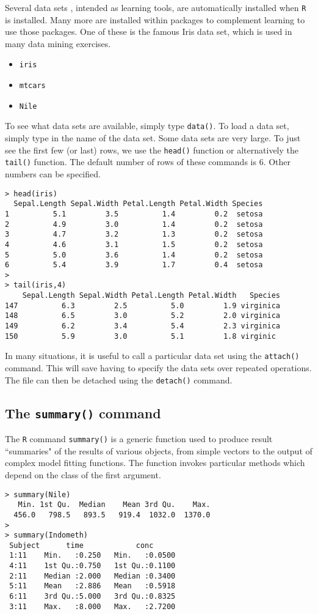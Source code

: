 \documentclass[a4paper,12pt]{article}
\begin{document}
Several data sets , intended as learning tools, are automatically installed when \texttt{R} is installed. Many more are installed within packages to complement learning to use those packages. One of these is the famous Iris data set, which is used in many data mining exercises.
\begin{itemize}
\item \texttt{iris}
\item \texttt{mtcars}
\item \texttt{Nile}
\end{itemize}
To see what data sets are available, simply type \texttt{data()}.
To load a data set, simply type in the name of the data set. Some data sets are very large. To just see the first few (or last)  rows, we use the \texttt{head()} function or alternatively the \texttt{tail()} function. The default number of rows of these commands is 6. Other numbers can be specified.
\begin{verbatim} 
> head(iris)
  Sepal.Length Sepal.Width Petal.Length Petal.Width Species
1          5.1         3.5          1.4         0.2  setosa
2          4.9         3.0          1.4         0.2  setosa
3          4.7         3.2          1.3         0.2  setosa
4          4.6         3.1          1.5         0.2  setosa
5          5.0         3.6          1.4         0.2  setosa
6          5.4         3.9          1.7         0.4  setosa
>
> tail(iris,4)
    Sepal.Length Sepal.Width Petal.Length Petal.Width   Species
147          6.3         2.5          5.0         1.9 virginica
148          6.5         3.0          5.2         2.0 virginica
149          6.2         3.4          5.4         2.3 virginica
150          5.9         3.0          5.1         1.8 virginic
\end{verbatim}
In many situations, it is useful to call a particular data set using the \texttt{attach()} command. This will save having to specify the data sets over repeated operations. The file can then be detached using 
 the \texttt{detach()} command.
\subsection{The \texttt{summary()} command}
The \texttt{R} command \texttt{summary()} is a generic function used to produce result ``summaries" of the results of various objects, from simple vectors to the output of complex model fitting functions.
The function invokes particular methods which depend on the class of the first argument.
\begin{framed}
\begin{verbatim}
> summary(Nile)
   Min. 1st Qu.  Median    Mean 3rd Qu.    Max.
  456.0   798.5   893.5   919.4  1032.0  1370.0
>
> summary(Indometh)
 Subject      time            conc
 1:11    Min.   :0.250   Min.   :0.0500
 4:11    1st Qu.:0.750   1st Qu.:0.1100
 2:11    Median :2.000   Median :0.3400
 5:11    Mean   :2.886   Mean   :0.5918
 6:11    3rd Qu.:5.000   3rd Qu.:0.8325
 3:11    Max.   :8.000   Max.   :2.7200 
\end{verbatim}
\end{framed}
\end{document}
